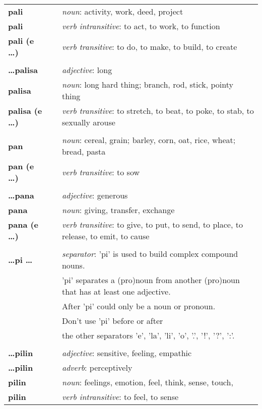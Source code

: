 \begin{supertabular}{p{2,5cm}|ll}
\textbf{pali} && \textit{noun}: activity, work, deed, project \\ 
\textbf{pali} && \textit{verb intransitive}: to act, to work, to function \\ 
\textbf{pali (e \dots)} && \textit{verb transitive}: to do, to make, to build, to create \\ 
 && \\ %
\textbf{\dots palisa} && \textit{adjective}: long \\ 
\textbf{palisa} && \textit{noun}: long hard thing; branch, rod, stick, pointy thing \\ 
\textbf{palisa (e \dots)} && \textit{verb transitive}: to stretch, to beat, to poke, to stab, to sexually arouse \\ 
 && \\ %
\textbf{pan} && \textit{noun}: cereal, grain; barley, corn, oat, rice, wheat; bread, pasta \\ 
\textbf{pan (e \dots)} && \textit{verb transitive}: to sow \\
 && \\ %
\textbf{\dots pana} && \textit{adjective}: generous \\ 
\textbf{pana} && \textit{noun}: giving, transfer, exchange \\ 
\textbf{pana (e \dots)} && \textit{verb transitive}: to give, to put, to send, to place, to release, to emit, to cause \\ 
 && \\ %
\textbf{\dots pi \dots } && \textit{separator}: 'pi' is used to build complex compound nouns. \\ && 'pi' separates a (pro)noun from another (pro)noun that has at least one adjective. \\ && After 'pi' could only be a noun or pronoun. \\ && Don't use 'pi' before or after \\ && the other separators 'e', 'la', 'li', 'o', '.', '!', '?', ':'.  \\ 
 && \\ %
\textbf{\dots pilin} && \textit{adjective}: sensitive, feeling, empathic \\ 
\textbf{\dots pilin} && \textit{adverb}: perceptively \\ 
\textbf{pilin} && \textit{noun}: feelings, emotion, feel, think, sense, touch, \\ 
\textbf{pilin} && \textit{verb intransitive}: to feel, to sense \\ 

\end{supertabular}
